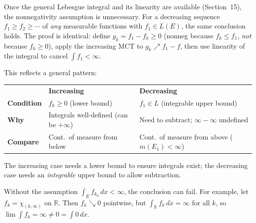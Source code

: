 \documentclass[11pt]{report}
\begin{document}
\begin{rembox}
Once the general Lebesgue integral and its linearity are available (Section~15), the nonnegativity assumption is unnecessary. For a decreasing sequence $f_1 \geq f_2 \geq \cdots$ of \textit{any} measurable functions with $f_1 \in L(E)$, the same conclusion holds. The proof is identical: define $g_k = f_1 - f_k \geq 0$ (nonneg because $f_k \leq f_1$, \textit{not} because $f_k \geq 0$), apply the increasing MCT to $g_k \nearrow f_1 - f$, then use linearity of the integral to cancel $\int f_1 < \infty$.

This reflects a general pattern:
\begin{center}
\begin{tabular}{lll}
& \textbf{Increasing} & \textbf{Decreasing} \\
\textbf{Condition} & $f_k \geq 0$ (lower bound) & $f_1 \in L$ (integrable upper bound) \\
\textbf{Why} & Integrals well-defined (can be $+\infty$) & Need to subtract; $\infty - \infty$ undefined \\
\textbf{Compare} & Cont.\ of measure from below & Cont.\ of measure from above ($m(E_1) < \infty$)
\end{tabular}
\end{center}
The increasing case needs a lower bound to ensure integrals exist; the decreasing case needs an \textit{integrable} upper bound to allow subtraction.
\end{rembox}

\begin{rembox}
Without the assumption $\int_E f_{k_0}\,dx < \infty$, the conclusion can fail. For example, let $f_k = \chi_{(k, \infty)}$ on $\mathbb{R}$. Then $f_k \searrow 0$ pointwise, but $\int_{\mathbb{R}} f_k\,dx = \infty$ for all $k$, so $\lim \int f_k = \infty \neq 0 = \int 0\,dx$.
\end{rembox}
\end{document}
